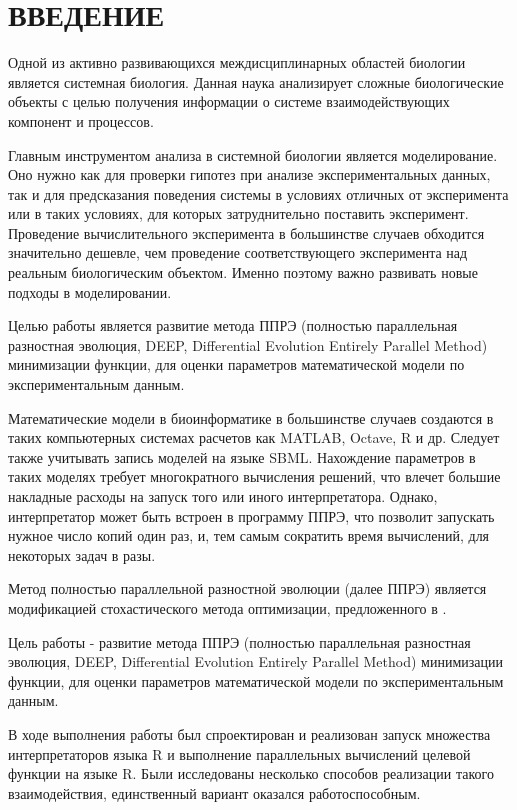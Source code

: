 \chapter*{ВВЕДЕНИЕ}

Одной из активно развивающихся междисциплинарных областей биологии является системная биология. 
Данная наука анализирует сложные биологические объекты с целью получения информации о системе взаимодействующих компонент и процессов.

Главным инструментом анализа в системной биологии является моделирование.
Оно нужно как для проверки гипотез при анализе экспериментальных данных, так и для предсказания поведения системы в условиях отличных от эксперимента или в таких условиях, для которых затруднительно поставить эксперимент.
Проведение вычислительного эксперимента в большинстве случаев обходится значительно дешевле, чем проведение соответствующего эксперимента над реальным биологическим объектом.
Именно поэтому важно развивать новые подходы в моделировании.


Целью работы является развитие метода ППРЭ (полностью параллельная разностная эволюция, DEEP, Differential Evolution Entirely Parallel Method) минимизации функции, для оценки параметров математической модели по экспериментальным данным.

Математические модели в биоинформатике в большинстве случаев создаются в таких компьютерных системах расчетов как MATLAB, Octave, R и др. Следует также учитывать запись моделей на языке SBML. Нахождение параметров в таких моделях требует многократного вычисления решений, что влечет большие накладные расходы на запуск того или иного интерпретатора. Однако, интерпретатор может быть встроен в программу ППРЭ, что позволит запускать нужное число копий один раз, и, тем самым сократить время вычислений, для некоторых задач в разы.



Метод полностью параллельной разностной эволюции (далее ППРЭ) \cite{Kozlov11, Kozlov13} является модификацией стохастического метода оптимизации, предложенного в \cite{Storn95}.

Цель работы - развитие метода ППРЭ (полностью параллельная разностная эволюция, DEEP, Differential Evolution Entirely Parallel Method) минимизации функции, для оценки параметров математической модели по экспериментальным данным.

В ходе выполнения работы был спроектирован и реализован запуск множества интерпретаторов языка R и выполнение параллельных вычислений целевой функции на языке R. Были исследованы несколько способов реализации такого взаимодействия, единственный вариант оказался работоспособным.




